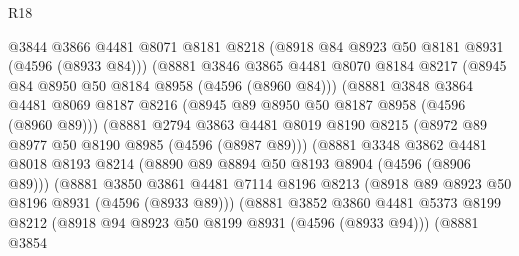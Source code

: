 \begin{lexlean}{R18}
\begin{coremodule}
                            @3844
                            @3866
                            @4481
                            @8071
                            @8181
                            @8218
                            (@8918 @84 @8923 @50 @8181 @8931 (@4596 (@8933 @84)))
                            (@8881
                              @3846
                              @3865
                              @4481
                              @8070
                              @8184
                              @8217
                              (@8945 @84 @8950 @50 @8184 @8958 (@4596 (@8960 @84)))
                              (@8881
                                @3848
                                @3864
                                @4481
                                @8069
                                @8187
                                @8216
                                (@8945 @89 @8950 @50 @8187 @8958 (@4596 (@8960 @89)))
                                (@8881
                                  @2794
                                  @3863
                                  @4481
                                  @8019
                                  @8190
                                  @8215
                                  (@8972 @89 @8977 @50 @8190 @8985 (@4596 (@8987 @89)))
                                  (@8881
                                    @3348
                                    @3862
                                    @4481
                                    @8018
                                    @8193
                                    @8214
                                    (@8890 @89 @8894 @50 @8193 @8904 (@4596 (@8906 @89)))
                                    (@8881
                                      @3850
                                      @3861
                                      @4481
                                      @7114
                                      @8196
                                      @8213
                                      (@8918 @89 @8923 @50 @8196 @8931 (@4596 (@8933 @89)))
                                      (@8881
                                        @3852
                                        @3860
                                        @4481
                                        @5373
                                        @8199
                                        @8212
                                        (@8918 @94 @8923 @50 @8199 @8931 (@4596 (@8933 @94)))
                                        (@8881
                                          @3854

\end{coremodule}
\end{lexlean}
